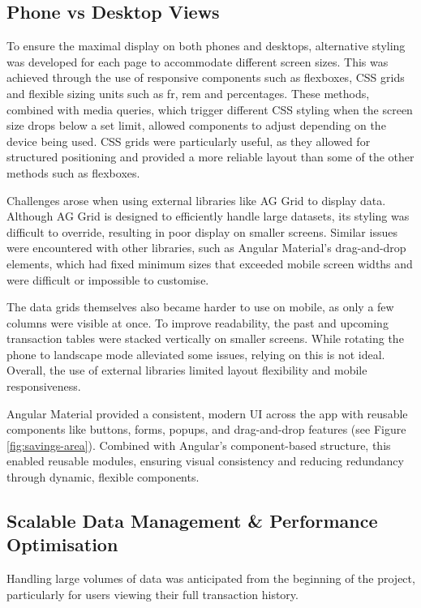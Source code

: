 \documentclass{l4proj}
\begin{document}
\subsection{Phone vs Desktop Views}
To ensure the maximal display on both phones and desktops, alternative styling was developed for each page to accommodate different screen sizes. This was achieved through the use of responsive components such as flexboxes, CSS grids and flexible sizing units such as fr, rem and percentages. These methods, combined with media queries, which trigger different CSS styling when the screen size drops below a set limit, allowed components to adjust depending on the device being used. CSS grids were particularly useful, as they allowed for structured positioning and provided a more reliable layout than some of the other methods such as flexboxes.

Challenges arose when using external libraries like AG Grid to display data. Although AG Grid is designed to efficiently handle large datasets, its styling was difficult to override, resulting in poor display on smaller screens. Similar issues were encountered with other libraries, such as Angular Material’s drag-and-drop elements, which had fixed minimum sizes that exceeded mobile screen widths and were difficult or impossible to customise. 

The data grids themselves also became harder to use on mobile, as only a few columns were visible at once. To improve readability, the past and upcoming transaction tables were stacked vertically on smaller screens. While rotating the phone to landscape mode alleviated some issues, relying on this is not ideal. Overall, the use of external libraries limited layout flexibility and mobile responsiveness.

Angular Material provided a consistent, modern UI across the app with reusable components like buttons, forms, popups, and drag-and-drop features (see Figure \ref{fig:savings-area}). Combined with Angular’s component-based structure, this enabled reusable modules, ensuring visual consistency and reducing redundancy through dynamic, flexible components.

\subsection{Scalable Data Management \& Performance Optimisation}
Handling large volumes of data was anticipated from the beginning of the project, particularly for users viewing their full transaction history.
\end{document}
